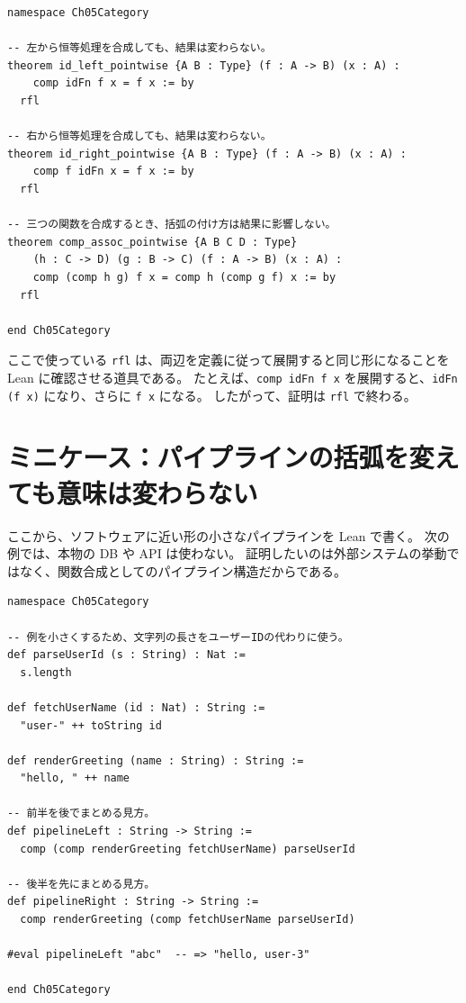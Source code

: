 \begin{listing}[htbp]
\begin{verbatim}
namespace Ch05Category

-- 左から恒等処理を合成しても、結果は変わらない。
theorem id_left_pointwise {A B : Type} (f : A -> B) (x : A) :
    comp idFn f x = f x := by
  rfl

-- 右から恒等処理を合成しても、結果は変わらない。
theorem id_right_pointwise {A B : Type} (f : A -> B) (x : A) :
    comp f idFn x = f x := by
  rfl

-- 三つの関数を合成するとき、括弧の付け方は結果に影響しない。
theorem comp_assoc_pointwise {A B C D : Type}
    (h : C -> D) (g : B -> C) (f : A -> B) (x : A) :
    comp (comp h g) f x = comp h (comp g f) x := by
  rfl

end Ch05Category
\end{verbatim}
\caption{恒等律と結合律を点ごとの等式として確認する}
\label{lst:ch05_laws}
\end{listing}

ここで使っている \texttt{rfl} は、両辺を定義に従って展開すると同じ形になることを Lean に確認させる道具である。
たとえば、\texttt{comp idFn f x} を展開すると、\texttt{idFn (f x)} になり、さらに \texttt{f x} になる。
したがって、証明は \texttt{rfl} で終わる。

\section{ミニケース：パイプラインの括弧を変えても意味は変わらない}

ここから、ソフトウェアに近い形の小さなパイプラインを Lean で書く。
次の例では、本物の DB や API は使わない。
証明したいのは外部システムの挙動ではなく、関数合成としてのパイプライン構造だからである。

\begin{listing}[htbp]
\begin{verbatim}
namespace Ch05Category

-- 例を小さくするため、文字列の長さをユーザーIDの代わりに使う。
def parseUserId (s : String) : Nat :=
  s.length

def fetchUserName (id : Nat) : String :=
  "user-" ++ toString id

def renderGreeting (name : String) : String :=
  "hello, " ++ name

-- 前半を後でまとめる見方。
def pipelineLeft : String -> String :=
  comp (comp renderGreeting fetchUserName) parseUserId

-- 後半を先にまとめる見方。
def pipelineRight : String -> String :=
  comp renderGreeting (comp fetchUserName parseUserId)

#eval pipelineLeft "abc"  -- => "hello, user-3"

end Ch05Category
\end{verbatim}
\caption{三段階の処理パイプラインを定義する}
\label{lst:ch05_pipeline}
\end{listing}

